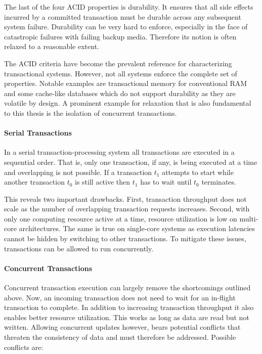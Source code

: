 The last of the four ACID properties is durability. It ensures that all side
effects incurred by a committed transaction must be durable across any
subsequent system failure. Durability can be very hard to enforce, especially in
the face of catastropic failures with failing backup media. Therefore its notion
is often relaxed to a reasonable extent.

The ACID criteria have become the prevalent reference for characterizing
transactional systems. However, not all systems enforce the complete set of
properties. Notable examples are transactional memory for conventional RAM and
some cache-like databases which do not support durability as they are volatile
by design. A prominent example for relaxation that is also fundamental to this thesis is the isolation of concurrent transactions.

\paragraph{Serial Transactions}

In a serial transaction-processing system all transactions are executed in a
sequential order. That is, only one transaction, if any, is being executed at a
time and overlapping is not possible. If a transaction $t_1$ attempts to start
while another transaction $t_0$ is still active then $t_1$ has to wait until
$t_0$ terminates.

This reveals two important drawbacks. First, transaction throughput does not
scale as the number of overlapping transaction requests increases. Second, with
only one computing resource active at a time, resource utilization is low on
multi-core architectures. The same is true on single-core systems as execution
latencies cannot be hidden by switching to other transactions. To mitigate these
issues, transactions can be allowed to run concurrently.

\paragraph{Concurrent Transactions}

Concurrent transaction execution can largely remove the shortcomings outlined above. Now, an incoming transaction does not need to wait for an in-flight transaction to complete. In addition to increasing transaction throughput it also enables better resource utilization. This works as long as data are read but not written. Allowing concurrent updates however, bears potential conflicts that threaten the consistency of data and must therefore be addressed. Possible conflicts are:

